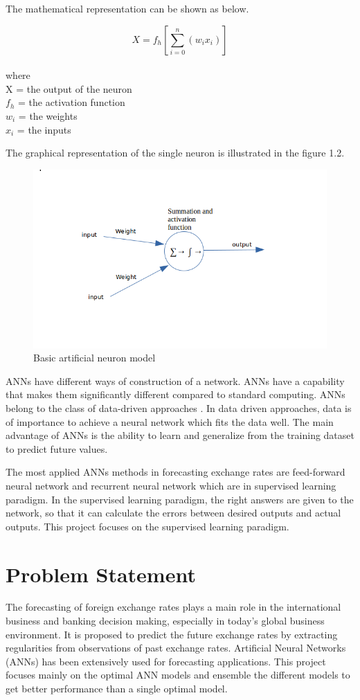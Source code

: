 The mathematical representation can be shown as below. 

\begin{equation*}
	X = f_h[\sum_{i=0}^n (w_ix_i)]
\end{equation*}
\\
where\\
X = the output of the neuron \\ 
$f_h$ = the activation function \\
$w_i$ = the weights \\
$x_i$ = the inputs

The graphical representation of the single neuron is illustrated in the figure 1.2.
\begin{figure}[hbt!]\centering
	\includegraphics[width=.6\textwidth]{basic_model}
	\caption{Basic artificial neuron  model }
\end{figure}

ANNs have different ways of construction of a network. ANNs have a capability that makes them significantly different compared to standard computing. ANNs belong to the class of data-driven approaches \cite{talati:2000}. In data driven approaches, data is of importance  to achieve a neural network which fits the data well. The main advantage of ANNs is the ability to learn and generalize from the training dataset to predict future values.  

The most applied ANNs methods in forecasting exchange rates are feed-forward  neural network and recurrent neural network which are in  supervised learning paradigm. In the supervised learning paradigm, the right answers are given to the network, so that it can calculate the errors between desired outputs and actual outputs. This project focuses on the supervised learning paradigm. 

\section{Problem Statement }
The forecasting of foreign exchange rates plays a main role in the international  business and banking decision making, especially in today's global business environment. It is proposed to predict the future exchange rates by extracting regularities from observations of past exchange rates. Artificial Neural Networks (ANNs) has been extensively used for forecasting applications. This project focuses mainly on the  optimal ANN models and ensemble  the different models to get better performance than a  single optimal model.

